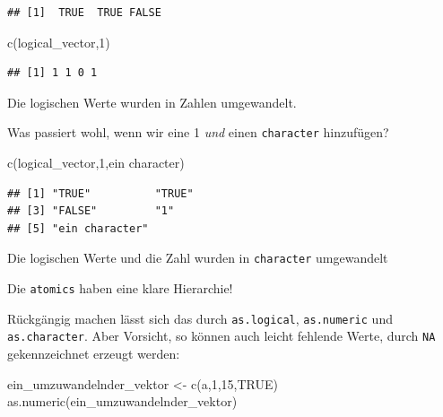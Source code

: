 \documentclass[
]{book}
\newenvironment{Shaded}{\begin{snugshade}}{\end{snugshade}}
\newcommand{\ConstantTok}[1]{\textcolor[rgb]{0.00,0.00,0.00}{#1}}
\newcommand{\DecValTok}[1]{\textcolor[rgb]{0.00,0.00,0.81}{#1}}
\newcommand{\FunctionTok}[1]{\textcolor[rgb]{0.00,0.00,0.00}{#1}}
\newcommand{\NormalTok}[1]{#1}
\newcommand{\OtherTok}[1]{\textcolor[rgb]{0.56,0.35,0.01}{#1}}
\newcommand{\StringTok}[1]{\textcolor[rgb]{0.31,0.60,0.02}{#1}}
\begin{document}
\begin{verbatim}
## [1]  TRUE  TRUE FALSE
\end{verbatim}

\begin{Shaded}
\begin{Highlighting}[]
\FunctionTok{c}\NormalTok{(logical\_vector,}\DecValTok{1}\NormalTok{)}
\end{Highlighting}
\end{Shaded}

\begin{verbatim}
## [1] 1 1 0 1
\end{verbatim}

Die logischen Werte wurden in Zahlen umgewandelt.

Was passiert wohl, wenn wir eine 1 \emph{und} einen \texttt{character} hinzufügen?

\begin{Shaded}
\begin{Highlighting}[]
\FunctionTok{c}\NormalTok{(logical\_vector,}\DecValTok{1}\NormalTok{,}\StringTok{\textquotesingle{}ein character\textquotesingle{}}\NormalTok{)}
\end{Highlighting}
\end{Shaded}

\begin{verbatim}
## [1] "TRUE"          "TRUE"         
## [3] "FALSE"         "1"            
## [5] "ein character"
\end{verbatim}

Die logischen Werte und die Zahl wurden in \texttt{character} umgewandelt

Die \texttt{atomics} haben eine klare Hierarchie!

Rückgängig machen lässt sich das durch \texttt{as.logical}, \texttt{as.numeric} und \texttt{as.character}. Aber Vorsicht, so können auch leicht fehlende Werte, durch \texttt{NA} gekennzeichnet erzeugt werden:

\begin{Shaded}
\begin{Highlighting}[]
\NormalTok{ein\_umzuwandelnder\_vektor }\OtherTok{\textless{}{-}} \FunctionTok{c}\NormalTok{(}\StringTok{\textquotesingle{}a\textquotesingle{}}\NormalTok{,}\DecValTok{1}\NormalTok{,}\DecValTok{15}\NormalTok{,}\ConstantTok{TRUE}\NormalTok{)}
\FunctionTok{as.numeric}\NormalTok{(ein\_umzuwandelnder\_vektor)}
\end{Highlighting}
\end{Shaded}
\end{document}
